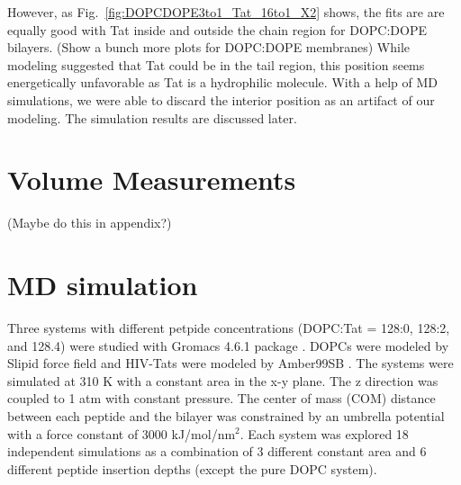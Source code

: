 \documentclass[12pt,letterpaper]{article}
\begin{document}
However, as Fig.~\ref{fig:DOPCDOPE3to1_Tat_16to1_X2} shows, the fits are are 
equally good with Tat inside and outside the chain region for DOPC:DOPE bilayers.
(Show a bunch more plots for DOPC:DOPE membranes) 
While modeling suggested
that Tat could be in the tail region, this position seems energetically 
unfavorable as Tat is a hydrophilic molecule. With a help of MD simulations,
we were able to discard the interior position as an artifact of our 
modeling. The simulation results are discussed later.

\newpage
\section{Volume Measurements}
(Maybe do this in appendix?)

\newpage
\section{MD simulation}
Three systems with different petpide concentrations (DOPC:Tat = 128:0, 128:2, and 128.4)
were studied with Gromacs 4.6.1 package \cite{ref:Hess08}. DOPCs were modeled by Slipid 
force field \cite{ref:Jambeck12_JPCB,ref:Jambeck12_JCTC} and HIV-Tats
were modeled by Amber99SB \cite{ref:Hornak06}. The systems were simulated at 
310 K with a constant
area in the x-y plane. The z direction was coupled to 1 atm with constant pressure. The
center of mass (COM) distance between each peptide and the bilayer was constrained by an
umbrella potential with a force constant of 3000 kJ/mol/nm$^2$. Each system was explored
18 independent simulations as a combination of 3 different constant area and 6 different
peptide insertion depths (except the pure DOPC system).
\end{document}
